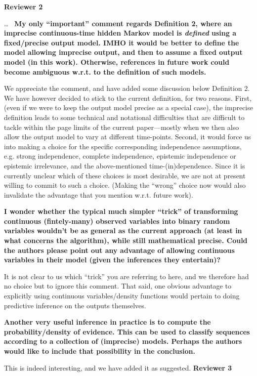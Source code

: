 \documentclass[twoside,11pt]{letter}
\begin{document}
\newpage
{\bf Reviewer 2}

\ldots~
{\bf
My only ``important'' comment regards Definition 2, where an imprecise continuous-time hidden Markov model is \emph{defined} using a fixed/precise output model. IMHO it would be better to define the model allowing imprecise output, and then to assume a fixed output model (in this work). Otherwise, references in future work could become ambiguous w.r.t. to the definition of such models. }

We appreciate the comment, and have added some discussion below Definition 2. We have however decided to stick to the current definition, for two reasons. First, (even if we were to keep the output model precise as a special case), the imprecise definition leads to some technical and notational difficulties that are difficult to tackle within the page limits of the current paper---mostly when we then also allow the output model to vary at different time-points. Second, it would force us into making a choice for the specific corresponding independence assumptions, e.g. strong independence, complete independence, epistemic independence or epistemic irrelevance, and the above-mentioned time-(in)dependence. Since it is currently unclear which of these choices is most desirable, we are not at present willing to commit to such a choice. (Making the ``wrong'' choice now would also invalidate the advantage that you mention w.r.t. future work).

{\bf
I wonder whether the typical much simpler ``trick'' of transforming continuous (fintely-many) observed variables into binary random variables wouldn't be as general as the current approach (at least in what concerns the algorithm), while still mathematical precise. Could the authors please point out any advantage of allowing continuous variables in their model (given the inferences they entertain)? }

It is not clear to us which ``trick'' you are referring to here, and we therefore had no choice but to ignore this comment. That said, one obvious advantage to explicitly using continuous variables/density functions would pertain to doing predictive inference on the outputs themselves.

{\bf
Another very useful inference in practice is to compute the probability/density of evidence. This can be used to classify sequences according to a collection of (imprecise) models. Perhaps the authors would like to include that possibility in the conclusion. }

This is indeed interesting, and we have added it as suggested.
\newpage
{\bf Reviewer 3}
\end{document}
